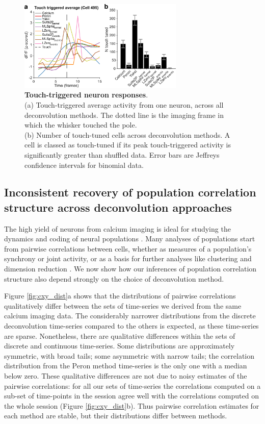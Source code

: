 \documentclass[a4paper,11pt]{article}
\begin{document}
\begin{figure}
	\centering
\includegraphics[width=0.7\textwidth]{composite_figs/fig6_touch_tuning}
\caption{\label{fig:touch_triggered} \textbf{Touch-triggered neuron responses}. \\ 	
	(a) Touch-triggered average activity from one neuron, across all deconvolution methods. The dotted line is the imaging frame in which the whisker touched the pole. \\
	(b) Number of touch-tuned cells across deconvolution methods. A cell is classed as touch-tuned if its peak touch-triggered activity is significantly greater than shuffled data. Error bars are Jeffreys confidence intervals for binomial data.}
\end{figure}


\subsection{Inconsistent recovery of population correlation structure across deconvolution approaches}
The high yield of neurons from calcium imaging is ideal for studying the dynamics and coding of neural populations \citep{Harvey2012-bh,Huber2012-mi,Kato2015-sb}. Many analyses of populations start from pairwise correlations between cells, whether as measures of a population's synchrony or joint activity, or as a basis for further analyses like clustering and dimension reduction \citep{Cunningham2014-vd}. We now show how our inferences of population correlation structure also depend strongly on the choice of deconvolution method.

Figure \ref{fig:cxy_dist}a shows that the distributions of pairwise correlations qualitatively differ between the sets of time-series we derived from the same calcium imaging data. The considerably narrower distributions from the discrete deconvolution time-series compared to the others is expected, as these time-series are sparse. Nonetheless, there are qualitative differences within the sets of discrete and continuous time-series. Some distributions are approximately symmetric, with broad tails; some asymmetric with narrow tails; the correlation distribution from the Peron method time-series is the only one with a median below zero. These qualitative differences are not due to noisy estimates of the pairwise correlations: for all our sets of time-series the correlations computed on a sub-set of time-points in the session agree well with the correlations computed on the whole session (Figure \ref{fig:cxy_dist}b). Thus pairwise correlation estimates for each method are stable, but their distributions differ between methods.
\end{document}

